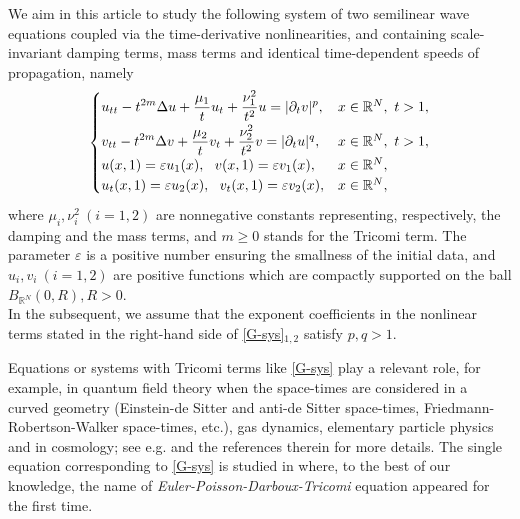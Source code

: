 \documentclass[12pt,leqno]{amsart}
\numberwithin{equation}{section}
\theoremstyle{remark}
\newcommand{\m}{m}
\newcommand{\M}{m}
\def\R{{\mathbb{R}}}
\def\d{\displaystyle}
\def\e{{\varepsilon}}
\begin{document}
We aim in this article to study the following system of two semilinear wave equations coupled via the time-derivative nonlinearities, and containing    scale-invariant damping terms,  mass terms and identical time-dependent speeds of propagation, namely
\begin{align}\label{G-sys}
\begin{cases}\d u_{tt}-t^{2 \m}\Delta u +\frac{\mu_1}{t}u_t+\frac{\nu_1^2}{t^2}u=|\partial_t v|^p, &  x\in \mathbb{R}^N, \ t>1, \vspace{.1cm}\\
\d v_{tt}-t^{2 \M}\Delta v +\frac{\mu_2}{t}v_t+\frac{\nu_2^2}{t^2}v=|\partial_t u|^q, &  x\in \R^N, \ t>1,\\
u(x,1)=\e u_1(x), \ \ v(x,1)=\e v_1(x), & x\in \mathbb{R}^N, \\ u_t(x,1)=\e u_2(x), \ \  v_t(x,1)=\varepsilon v_2(x), & x\in \mathbb{R}^N,
\end{cases}
\end{align} 
where $\mu_i,\nu^2_i \ (i=1,2)$ are nonnegative constants representing, respectively, the damping and the mass terms, and $m \ge 0$ stands for the Tricomi term.  The parameter $\e$ is a positive number ensuring the smallness of the initial
data,  and $u_i,v_i\ (i=1,2)$  are positive functions which are compactly supported on the ball $B_{\R^N}(0,R), R>0$.\\
In the subsequent, we assume that the exponent coefficients in the nonlinear terms stated in the right-hand side of \eqref{G-sys}$_{1,2}$ satisfy  $p, q>1$.


Equations or systems  with Tricomi terms like \eqref{G-sys} play a relevant role, for example,  in  quantum field theory when the space-times are considered in a curved geometry (Einstein-de Sitter and anti-de Sitter space-times,
Friedmann-Robertson-Walker space-times, etc.), gas dynamics, elementary particle physics and in cosmology; see e.g. \cite{Yagdjian} and the references therein for more details. The single equation corresponding to \eqref{G-sys} is studied in \cite{Lai-Palm-24, Pal24} where, to the best of our knowledge,  the name of {\it Euler-Poisson-Darboux-Tricomi} equation appeared for the first time.
\end{document}
